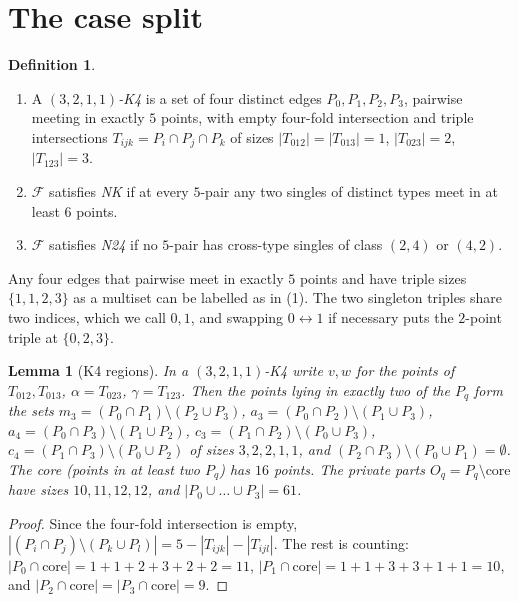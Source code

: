 \documentclass[11pt]{amsart}
\newtheorem{lemma}[theorem]{Lemma}
\theoremstyle{definition}
\newtheorem{definition}[theorem]{Definition}
\newcommand{\cF}{\mathcal{F}}
\begin{document}
\section{The case split}\label{sec:split}

\begin{definition}
\begin{enumerate}
\item A \emph{$(3,2,1,1)$-K4} is a set of four distinct edges $P_0,P_1,P_2,P_3$, pairwise meeting in exactly $5$ points, with empty four-fold intersection and triple intersections $T_{ijk}=P_i\cap P_j\cap P_k$ of sizes $|T_{012}|=|T_{013}|=1$, $|T_{023}|=2$, $|T_{123}|=3$.
\item $\cF$ satisfies \emph{NK} if at every $5$-pair any two singles of distinct types meet in at least $6$ points.
\item $\cF$ satisfies \emph{N24} if no $5$-pair has cross-type singles of class $(2,4)$ or $(4,2)$.
\end{enumerate}
\end{definition}

Any four edges that pairwise meet in exactly $5$ points and have triple sizes $\{1,1,2,3\}$ as a multiset can be labelled as in (1). The two singleton triples share two indices, which we call $0,1$, and swapping $0\leftrightarrow1$ if necessary puts the $2$-point triple at $\{0,2,3\}$.

\begin{lemma}[K4 regions]\label{lem:K4regions}
In a $(3,2,1,1)$-K4 write $v,w$ for the points of $T_{012},T_{013}$, $\alpha=T_{023}$, $\gamma=T_{123}$. Then the points lying in exactly two of the $P_q$ form the sets $m_3=(P_0\cap P_1)\setminus(P_2\cup P_3)$, $a_3=(P_0\cap P_2)\setminus(P_1\cup P_3)$, $a_4=(P_0\cap P_3)\setminus(P_1\cup P_2)$, $c_3=(P_1\cap P_2)\setminus(P_0\cup P_3)$, $c_4=(P_1\cap P_3)\setminus(P_0\cup P_2)$ of sizes $3,2,2,1,1$, and $(P_2\cap P_3)\setminus(P_0\cup P_1)=\emptyset$. The \emph{core} (points in at least two $P_q$) has $16$ points. The private parts $O_q=P_q\setminus\text{core}$ have sizes $10,11,12,12$, and $|P_0\cup\dots\cup P_3|=61$.
\end{lemma}
\begin{proof}
Since the four-fold intersection is empty, $|(P_i\cap P_j)\setminus(P_k\cup P_l)|=5-|T_{ijk}|-|T_{ijl}|$. The rest is counting: $|P_0\cap\mathrm{core}|=1+1+2+3+2+2=11$, $|P_1\cap\mathrm{core}|=1+1+3+3+1+1=10$, and $|P_2\cap\mathrm{core}|=|P_3\cap\mathrm{core}|=9$.
\end{proof}
\end{document}
